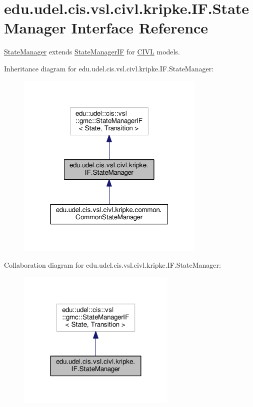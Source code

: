 \hypertarget{interfaceedu_1_1udel_1_1cis_1_1vsl_1_1civl_1_1kripke_1_1IF_1_1StateManager}{}\section{edu.\+udel.\+cis.\+vsl.\+civl.\+kripke.\+I\+F.\+State\+Manager Interface Reference}
\label{interfaceedu_1_1udel_1_1cis_1_1vsl_1_1civl_1_1kripke_1_1IF_1_1StateManager}


\hyperlink{interfaceedu_1_1udel_1_1cis_1_1vsl_1_1civl_1_1kripke_1_1IF_1_1StateManager}{State\+Manager} extends \hyperlink{}{State\+Manager\+I\+F} for \hyperlink{classedu_1_1udel_1_1cis_1_1vsl_1_1civl_1_1CIVL}{C\+I\+V\+L} models.  




Inheritance diagram for edu.\+udel.\+cis.\+vsl.\+civl.\+kripke.\+I\+F.\+State\+Manager\+:
\nopagebreak
\begin{figure}[H]
\begin{center}
\leavevmode
\includegraphics[width=256pt]{interfaceedu_1_1udel_1_1cis_1_1vsl_1_1civl_1_1kripke_1_1IF_1_1StateManager__inherit__graph}
\end{center}
\end{figure}


Collaboration diagram for edu.\+udel.\+cis.\+vsl.\+civl.\+kripke.\+I\+F.\+State\+Manager\+:
\nopagebreak
\begin{figure}[H]
\begin{center}
\leavevmode
\includegraphics[width=215pt]{interfaceedu_1_1udel_1_1cis_1_1vsl_1_1civl_1_1kripke_1_1IF_1_1StateManager__coll__graph}
\end{center}
\end{figure}
